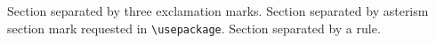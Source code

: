 \documentclass{article}
\begin{document}
Section separated by three exclamation marks.
\sectionbreak[!!!]
Section separated by asterism section mark requested in
\texttt{\textbackslash usepackage}.
\sectionbreak
Section separated by a rule.
\sectionbreakmark{\rule{10em}{3pt}}
\sectionbreak
\end{document}
